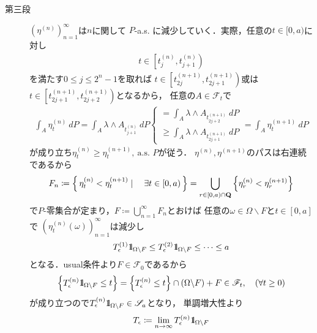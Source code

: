 \begin{prf}
\begin{description}
			\item[第三段]
				$\left( \eta^{(n)} \right)_{n=1}^\infty$は$n$に関して
				$P$-a.s. に減少していく．実際，任意の$t \in [0,a)$に対し
				\begin{align}
					t \in \left[t^{(n)}_j, t^{(n)}_{j+1}\right)
				\end{align}
				を満たす$0 \leq j \leq 2^n-1$を取れば
				$t \in \left[t^{(n+1)}_{2j}, t^{(n+1)}_{2j+1}\right)$或は
				$t \in \left[t^{(n+1)}_{2j+1}, t^{(n+1)}_{2j+2}\right)$となるから，
				任意の$A \in \mathscr{F}_t$で
				\begin{align}
					\int_A \eta^{(n)}_t\ dP
					= \int_A \lambda \wedge A_{t^{(n)}_{j+1}}\ dP
					\begin{cases}
						\displaystyle= \int_A \lambda \wedge A_{t^{(n+1)}_{2j+2}}\ dP \\
						\displaystyle\geq \int_A \lambda \wedge A_{t^{(n+1)}_{2j+1}}\ dP
					\end{cases}
					= \int_A \eta^{(n+1)}_t\ dP
				\end{align}
				が成り立ち$\eta^{(n)}_t \geq \eta^{(n+1)}_t,\ \mbox{a.s. $P$}$が従う．
				$\eta^{(n)},\eta^{(n+1)}$のパスは右連続であるから
				\begin{align}
					F_n \coloneqq \left\{\, \eta^{(n)}_t < \eta^{(n+1)}_t \mid \quad \exists t \in [0,a)\, \right\}
					= \bigcup_{r \in [0,a) \cap \mathbf{Q}} \left\{\eta^{(n)}_r < \eta^{(n+1)}_r\right\}
				\end{align}
				で$P$-零集合が定まり，$F \coloneqq \bigcup_{n=1}^\infty F_n$とおけば
				任意の$\omega \in \Omega \backslash F$と$t \in [0,a]$で
				$\left( \eta^{(n)}_t(\omega) \right)_{n=1}^\infty$は減少し
				\begin{align}
					T^{(1)}_\epsilon \mbox{1}\hspace{-0.25em}\mbox{l}_{\Omega \backslash F} 
					\leq T^{(2)}_\epsilon \mbox{1}\hspace{-0.25em}\mbox{l}_{\Omega \backslash F} \leq \cdots \leq a
					\label{eq:chapter_1_theorem_4_14_2}
				\end{align}
				となる．usual条件より$F \in \mathscr{F}_0$であるから
				\begin{align}
					\left\{ T^{(n)}_\epsilon \mbox{1}\hspace{-0.25em}\mbox{l}_{\Omega \backslash F} \leq t \right\}
					= \left\{ T^{(n)}_\epsilon \leq t \right\} \cap (\Omega \backslash F) + F
					\in \mathscr{F}_t,\quad (\forall t \geq 0)
				\end{align}
				が成り立つので$T^{(n)}_\epsilon \mbox{1}\hspace{-0.25em}\mbox{l}_{\Omega \backslash F} \in \mathscr{S}_a$となり，
				単調増大性より
				\begin{align}
					T_\epsilon \coloneqq \lim_{n \to \infty} T^{(n)}_\epsilon \mbox{1}\hspace{-0.25em}\mbox{l}_{\Omega \backslash F}
				\end{align}

\end{description}
\end{prf}
